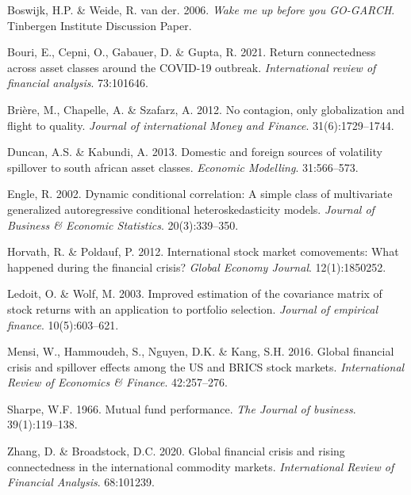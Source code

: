 \documentclass[11pt,preprint, authoryear]{elsarticle}
\numberwithin{equation}{section}
\numberwithin{figure}{section}
\numberwithin{table}{section}
\newlength{\cslhangindent}
\newenvironment{CSLReferences}%
  {\setlength{\parindent}{0pt}%
  \everypar{\setlength{\hangindent}{\cslhangindent}}\ignorespaces}%
  {\par}
\begin{document}
\hypertarget{refs}{}
\begin{CSLReferences}{1}{0}
\leavevmode{}%
Boswijk, H.P. \& Weide, R. van der. 2006. \emph{Wake me up before you
GO-GARCH}. Tinbergen Institute Discussion Paper.

\leavevmode{}%
Bouri, E., Cepni, O., Gabauer, D. \& Gupta, R. 2021. Return
connectedness across asset classes around the COVID-19 outbreak.
\emph{International review of financial analysis}. 73:101646.

\leavevmode{}%
Brière, M., Chapelle, A. \& Szafarz, A. 2012. No contagion, only
globalization and flight to quality. \emph{Journal of international
Money and Finance}. 31(6):1729--1744.

\leavevmode{}%
Duncan, A.S. \& Kabundi, A. 2013. Domestic and foreign sources of
volatility spillover to south african asset classes. \emph{Economic
Modelling}. 31:566--573.

\leavevmode{}%
Engle, R. 2002. Dynamic conditional correlation: A simple class of
multivariate generalized autoregressive conditional heteroskedasticity
models. \emph{Journal of Business \& Economic Statistics}.
20(3):339--350.

\leavevmode{}%
Horvath, R. \& Poldauf, P. 2012. International stock market comovements:
What happened during the financial crisis? \emph{Global Economy
Journal}. 12(1):1850252.

\leavevmode{}%
Ledoit, O. \& Wolf, M. 2003. Improved estimation of the covariance
matrix of stock returns with an application to portfolio selection.
\emph{Journal of empirical finance}. 10(5):603--621.

\leavevmode{}%
Mensi, W., Hammoudeh, S., Nguyen, D.K. \& Kang, S.H. 2016. Global
financial crisis and spillover effects among the US and BRICS stock
markets. \emph{International Review of Economics \& Finance}.
42:257--276.

\leavevmode{}%
Sharpe, W.F. 1966. Mutual fund performance. \emph{The Journal of
business}. 39(1):119--138.

\leavevmode{}%
Zhang, D. \& Broadstock, D.C. 2020. Global financial crisis and rising
connectedness in the international commodity markets.
\emph{International Review of Financial Analysis}. 68:101239.

\end{CSLReferences}


\end{document}
